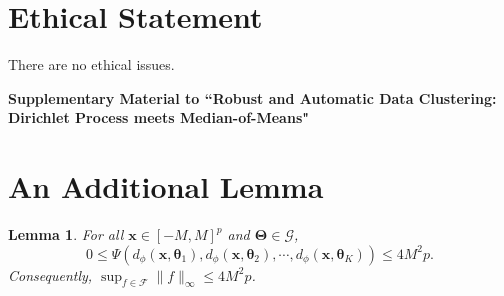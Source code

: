 \documentclass[12pt]{article}
\newtheorem{lemma}{Lemma}[section]
\begin{document}
\appendix

\section*{Ethical Statement}

There are no ethical issues.








\newpage

\onecolumn
\appendix

\begin{center}
    \LARGE{\bfseries Supplementary Material to ``Robust and Automatic Data Clustering:\\ Dirichlet Process meets Median-of-Means"}
\end{center}
\vspace{1cm}


\section{An Additional Lemma}

\begin{lemma}\label{lemma-bound-Psi}
    For all $\bm{x}\in [-M,M]^p$ and $\bm{\Theta}\in \mathscr{G}$, \[0\le \Psi(d_{\phi}(\bm{x},\bm{\theta}_1), d_{\phi}(\bm{x},\bm{\theta}_2),\cdots, d_{\phi}(\bm{x},\bm{\theta}_K) )\le 4M^2p.\]
    Consequently, $\sup_{f\in \mathcal{F}}\|f\|_{\infty}\le 4M^2p$.
\end{lemma}
\end{document}

